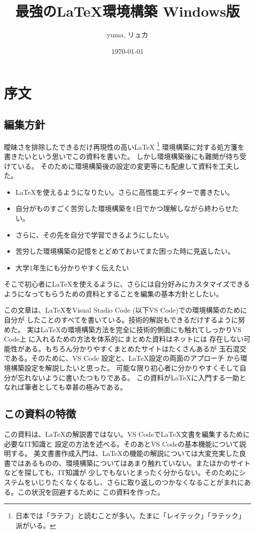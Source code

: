 \documentclass{ltjsarticle}
\begin{document}
\title{最強の\LaTeX 環境構築 Windows版}
\author{yuma, リュカ}
\date{\today}
\maketitle
\section{序文}
\subsection{編集方針}

曖昧さを排除したできるだけ再現性の高い\LaTeX 
\footnote{日本では「ラテフ」と読むことが多い。たまに「レイテック」「ラテック」派がいる。}
環境構築に対する処方箋を書きたいという思いでこの資料を書いた。
しかし環境構築後にも難関が待ち受けている。
そのために環境構築後の設定の変更等にも配慮して資料を工夫した。
\begin{itemize}
  \item \LaTeX を使えるようになりたい。さらに高性能エディターで書きたい。
  \item 自分がものすごく苦労した環境構築を1日でかつ理解しながら終わらせたい。
  \item さらに、その先を自分で学習できるようにしたい。
  \item 苦労した環境構築の記憶をとどめておいてまた困った時に見返したい。
  \item 大学1年生にも分かりやすく伝えたい
\end{itemize}
そこで初心者に\LaTeX を使えるように、さらには自分好みにカスタマイズできるようになってもらうための資料とすることを編集の基本方針としたい。

この文章は、\LaTeX をVisual Stadio Code (以下VS Code)での環境構築のために自分が
したことのすべてを書いている。技術的解説もできるだけするように努めた。
実は\LaTeX の環境構築方法を完全に技術的側面にも触れてしっかりVS Code上
に入れるための方法を体系的にまとめた資料はネットには
存在しない可能性がある。もちろん分かりやすくまとめたサイトはたくさんあるが
玉石混交である。そのために、VS Code 設定と、\LaTeX 設定の両面のアプローチ
から環境構築設定を解説したいと思った。
可能な限り初心者に分かりやすくそして自分が忘れないように書いたつもりである。
この資料が\LaTeX に入門する一助となれば筆者としても幸甚の極みである。

\subsection{この資料の特徴}
この資料は、\LaTeX の解説書ではない。VS Codeで\LaTeX 文書を編集するために必要なIT知識と
設定の方法を述べる。そのあとVS Codeの基本機能について説明する。
美文書書作成入門\cite{美文書本}は、\LaTeX の機能の解説については大変充実した良書ではあるものの、環境構築についてはあまり触れていない。またほかのサイトなどを探しても、IT知識が
少しでもないとまったく分からない。そのためにシステムをいじりたくなくなるし、さらに取り返しのつかなくなることがまれにある。この状況を回避するために
この資料を作った。
\end{document}
